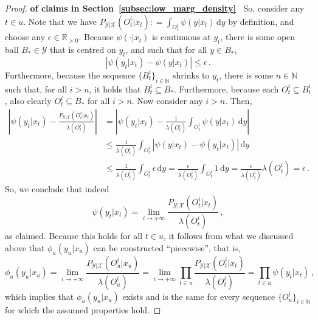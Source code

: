 \documentclass[3p]{elsarticle}
\newcommand{\nats}{\mathbb{N}}
\newcommand{\reals}{\mathbb{R}}
\newcommand{\realspos}{\reals_{>0}}
\newcommand{\states}{\mathcal{X}}
\newcommand{\observs}{\mathcal{Y}}
\newcommand{\abs}[1]{\left\vert #1 \right\vert}
\newcommand{\coloneqq}{:\!=}
\begin{document}
\begin{proof}{\bf of claims in Section~\ref{subsec:low_marg_density}~}
So, consider any $t\in u$. Note that we have $P_{\observs\vert\states}(O_t^i\vert x_t)\coloneqq \int_{O_t^i}\psi(y\vert x_t)\,\mathrm{d}y$ by definition, and choose any $\epsilon\in\realspos$. Because $\psi(\cdot\vert x_t)$ is continuous at $y_t$, there is some open ball $B_*\in\observs$ that is centred on $y_t$, and such that for all $y\in B_*$,
\begin{equation*}
\abs{\psi(y_t\vert x_t) - \psi(y\vert x_t)} \leq \epsilon\,.
\end{equation*}
Furthermore, because the sequence $\{B_t^i\}_{i\in\nats}$ shrinks to $y_t$, there is some $n\in\nats$ such that, for all $i>n$, it holds that $B_t^i\subseteq B_*$. Furthermore, because each $O_t^i\subseteq B_t^i$, also clearly $O_t^i\subseteq B_*$ for all $i>n$. Now consider any $i>n$. Then, 
\begin{align*}
\abs{\psi(y_t\vert x_t) - \frac{P_{\observs\vert\states}(O_t^i\vert x_t)}{\lambda(O_t^i)}} &= \abs{\psi(y_t\vert x_t) - \frac{1}{\lambda(O_t^i)}\int_{O_t^i}\psi(y\vert x_t)\,\mathrm{d}y} \\
 &\leq \frac{1}{\lambda(O_t^i)}\int_{O_t^i}\abs{\psi(y\vert x_t) - \psi(y_t\vert x_t)}\,\mathrm{d}y \\
 &\leq \frac{1}{\lambda(O_t^i)}\int_{O_t^i}\epsilon\,\mathrm{d}y
 = \frac{\epsilon}{\lambda(O_t^i)}\int_{O_t^i}1\,\mathrm{d}y 
 = \frac{\epsilon}{\lambda(O_t^i)}\lambda(O_t^i)
 = \epsilon\,.
\end{align*}
So, we conclude that indeed
\begin{equation*}
\psi(y_t\vert x_t) = \lim_{i\to+\infty}\frac{P_{\observs\vert\states}(O_t^i\vert x_t)}{\lambda(O_t^i)}\,,
\end{equation*}
as claimed. Because this holds for all $t\in u$, it follows from what we discussed above that $\phi_u(y_u\vert x_u)$ can be constructed ``piecewise'', that is,
\begin{equation*}
\phi_u(y_u\vert x_u) = \lim_{i\to+\infty}\frac{P_{\observs\vert\states}(O_u^i\vert x_u)}{\lambda(O_u^i)} = \lim_{i\to+\infty}\prod_{t\in u}\frac{P_{\observs\vert\states}(O_t^i\vert x_t)}{\lambda(O_t^i)} = \prod_{t\in u}\psi(y_t\vert x_t)\,,
\end{equation*}
which implies that $\phi_u(y_u\vert x_u)$ exists and is the same for every sequence $\{O_u^i\}_{i\in\nats}$ for which the assumed properties hold. 


\end{proof}
\end{document}
